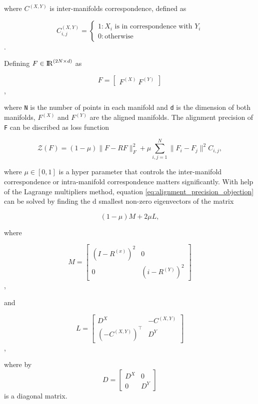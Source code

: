 \documentclass[11pt,a4paper]{article}
\begin{document}
  where $C^{(X,Y)}$ is inter-manifolds correspondence, defined as

  \[C_{i,j}^{(X,Y)}=\begin{cases}
                    1 : X_i\text{ is in correspondence with }Y_i\\
                    0 : \text{otherwise}
                    \end{cases}\].

  Defining $F\in {\rm I\!R}^{(2N\times d)}$ as

  \[F=\begin{bmatrix}
      F^{(X)}\
      F^{(Y)}
      \end{bmatrix}\],

  where \verb|N| is the number of points in each manifold and \verb|d| is the dimension of both manifolds, $F^{(X)}$ and $F^{(Y)}$ are the aligned manifolds. The alignment precision of \verb|F| can be discribed as loss function

  \begin{equation}\label{eq:alignment_precision_objection}
  \mathcal{Z}(F)=(1-\mu )\|F-RF\|^2_F+\mu\sum_{i,j=1}^N\|F_i-F_j\|^2C_{i,j},
  \end{equation}

  where $\mu\in[0,1]$ is a hyper parameter that controls the inter-manifold correspondence or intra-manifold correspondence matters significantly. With help of the Lagrange multipliers method, equation \eqref{eq:alignment_precision_objection} can be solved by finding the d smallest non-zero eigenvectors of the matrix

  \begin{equation}
  (1-\mu)M+2\mu L,
  \end{equation}

  where

  \[M=\begin{bmatrix}
    (I-R^{(x)})^2 & 0\\
    0 & (i-R^{(Y)})^2
    \end{bmatrix}\],

  and

  \[L=\begin{bmatrix}
    D^X & -C^{(X,Y)}\\
    (-C^{(X,Y)})^\intercal & D^Y
    \end{bmatrix}\],

  where by \[D=\begin{bmatrix}D^X & 0\\0 & D^Y\end{bmatrix}\] is a diagonal matrix.
\end{document}
